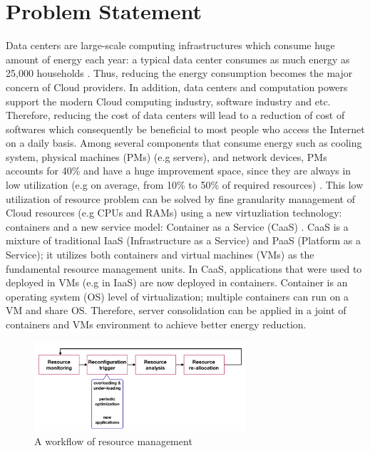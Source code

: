 \section{Problem Statement}

Data centers are large-scale computing infrastructures which consume huge amount of energy each year: a typical data center consumes as much energy as 25,000 households \cite{Dayarathna:2016ua}. Thus, reducing the energy consumption becomes the major concern of Cloud providers. 
In addition, data centers and computation powers support the modern Cloud computing industry, software industry and etc. Therefore, reducing the cost of data centers will lead to a reduction of cost of softwares which consequently be beneficial to most people who access the Internet on a daily basis.
Among several components that consume energy such as cooling system, physical machines (PMs) (e.g servers), and network devices, PMs accounts for 40\% and have a huge improvement space, since they are always in low utilization (e.g on average, from 10\% to 50\% of required resources) \cite{Barroso:2007jt,Shen:2015hm}. This low utilization of resource problem can be solved by fine granularity management of Cloud resources (e.g CPUs and RAMs) using a new virtuzliation technology: containers \cite{Felter:2015ki, He:2012im, Soltesz:2007cu} and a new service model: Container as a Service (CaaS) \cite{Piraghaj:2015uf}. CaaS is a mixture of traditional IaaS (Infrastructure as a Service) \cite{Mell:2011jj} and PaaS (Platform as a Service); it utilizes both containers and virtual machines (VMs) as the fundamental resource management units.
In CaaS, applications that were used to deployed in VMs (e.g in IaaS) are now deployed in containers. Container is an operating system (OS) level of virtualization; multiple containers can run on a VM and share OS. Therefore, server consolidation \cite{Varasteh:2015fu} can be applied in a joint of containers and VMs environment to achieve better energy reduction.



\begin{figure}
	\centering
	\includegraphics[width=0.7\textwidth]{pics/workflow_management.png}
	\caption{A workflow of resource management \cite{Mishra:2012kx}}
	\label{fig:workflow}
\end{figure}


